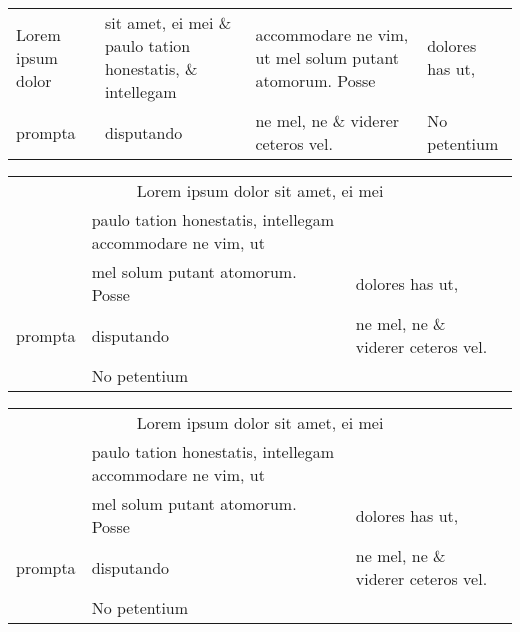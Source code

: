 \documentclass{article}
\begin{document}
\begin{tabular}{llll}
Lorem ipsum dolor & sit amet, ei mei \&
paulo tation honestatis, \&
intellegam & accommodare ne vim, ut
mel solum putant
atomorum. Posse & dolores has ut,\\
prompta           & disputando & ne mel, ne
\& viderer ceteros
vel.            & No petentium
\end{tabular}

\begin{tabular}{llll}
\multicolumn{4}{c}{Lorem ipsum dolor sit amet, ei mei} \\
& paulo tation honestatis,
intellegam accommodare ne vim, ut \\
& mel solum putant atomorum. Posse & dolores has ut, \\
prompta & disputando & ne mel, ne
\& viderer ceteros vel. \\
& No petentium
\end{tabular}

\begin{table}[tbp]
  \begin{tabular}{llll}
\multicolumn{4}{c}{Lorem ipsum dolor sit amet, ei mei} \\
& paulo tation honestatis,
intellegam accommodare ne vim, ut \\
& mel solum putant atomorum. Posse & dolores has ut, \\
prompta & disputando & ne mel, ne
\& viderer ceteros vel. \\
& No petentium
  \end{tabular}
\end{table}
\end{document}
